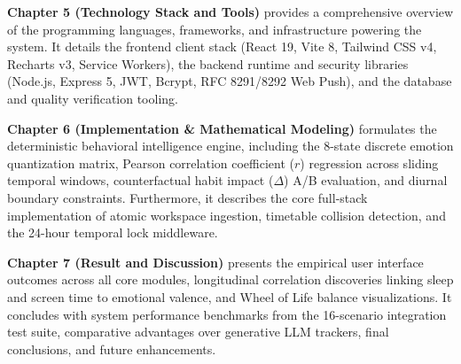 \documentclass[12pt, a4paper, oneside]{Thesis} %
\begin{document}
{\textbf{Chapter 5 (Technology Stack and Tools)} provides a comprehensive overview of the programming languages, frameworks, and infrastructure powering the system. It details the frontend client stack (React 19, Vite 8, Tailwind CSS v4, Recharts v3, Service Workers), the backend runtime and security libraries (Node.js, Express 5, JWT, Bcrypt, RFC 8291/8292 Web Push), and the database and quality verification tooling.

\textbf{Chapter 6 (Implementation \& Mathematical Modeling)} formulates the deterministic behavioral intelligence engine, including the 8-state discrete emotion quantization matrix, Pearson correlation coefficient ($r$) regression across sliding temporal windows, counterfactual habit impact ($\Delta$) A/B evaluation, and diurnal boundary constraints. Furthermore, it describes the core full-stack implementation of atomic workspace ingestion, timetable collision detection, and the 24-hour temporal lock middleware.

\textbf{Chapter 7 (Result and Discussion)} presents the empirical user interface outcomes across all core modules, longitudinal correlation discoveries linking sleep and screen time to emotional valence, and Wheel of Life balance visualizations. It concludes with system performance benchmarks from the 16-scenario integration test suite, comparative advantages over generative LLM trackers, final conclusions, and future enhancements.\par
}

\clearpage %


\pagestyle{fancy} %

\tableofcontents %

\listoffigures %

\end{document}
